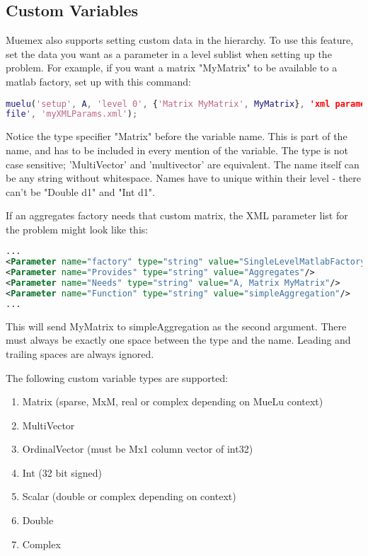 \subsection{Custom Variables}

Muemex also supports setting custom data in the hierarchy. To use this
feature, set the data you want as a parameter in a level sublist when
setting up the problem. For example, if you want a matrix "MyMatrix" to
be available to a matlab factory, set up with this command:

\begin{lstlisting}[language=Matlab]
muelu('setup', A, 'level 0', {'Matrix MyMatrix', MyMatrix}, 'xml parameter
file', 'myXMLParams.xml');
\end{lstlisting}

Notice the type specifier "Matrix" before the variable name. This is part
of the name, and has to be included in every mention of the variable. The
type is not case sensitive; 'MultiVector' and 'multivector' are equivalent.
The name itself can be any string without whitespace. Names have to unique
within their level - there can't be "Double d1" and "Int d1".

If an aggregates factory needs that custom matrix, the XML parameter list for
the problem might look like this:

\begin{lstlisting}[language=XML]
...
<Parameter name="factory" type="string" value="SingleLevelMatlabFactory"/>
<Parameter name="Provides" type="string" value="Aggregates"/>
<Parameter name="Needs" type="string" value="A, Matrix MyMatrix"/>
<Parameter name="Function" type="string" value="simpleAggregation"/>
...
\end{lstlisting}

This will send MyMatrix to simpleAggregation as the second argument.
There must always be exactly one space between the
type and the name. Leading and trailing spaces are always ignored.

The following custom variable types are supported:
\begin{enumerate}
\item Matrix (sparse, MxM, real or complex depending on MueLu context)
\item MultiVector
\item OrdinalVector (must be Mx1 column vector of int32)
\item Int (32 bit signed)
\item Scalar (double or complex depending on context)
\item Double
\item Complex
\end{enumerate}

